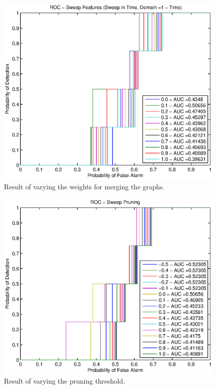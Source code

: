 \documentclass[conference]{IEEEtran}
\begin{document}
\begin{figure}
  \centering
  \includegraphics[width=0.9\linewidth]{weights.eps}
  \caption{Result of varying the weights for merging the graphs.}
  \label{fig:test:weights}
\end{figure}

\begin{figure}
  \centering
  \includegraphics[width=0.9\linewidth]{pruning_sweep.eps}
  \caption{Result of varying the pruning threshold.}
  \label{fig:test:pruning}
\end{figure}
\end{document}
